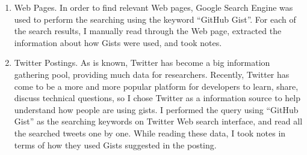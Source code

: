 \begin{enumerate}
	\item Web Pages. In order to find relevant Web pages, Google Search Engine was used to perform the searching using the keyword ``GitHub Gist''. For each of the search results, I manually read through the Web page, extracted the information about how Gists were used, and took notes.

	\item Twitter Postings. As is known, Twitter has become a big information gathering pool, providing much data for researchers. Recently, Twitter has come to be a more and more popular platform for developers to learn, share, discuss technical questions, so I chose Twitter as a information source to help understand how people are using gists. I performed the query using ``GitHub Gist'' as the searching keywords on Twitter Web search interface, and read all the searched tweets one by one. While reading these data, I took notes in terms of how they used Gists suggested in the posting. 
\end{enumerate}